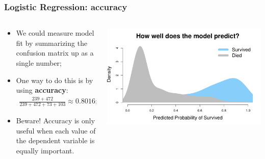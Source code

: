 \documentclass[aspectratio=169]{beamer}
\theoremstyle{principle}
\begin{document}
\begin{frame}
\frametitle{Logistic Regression: accuracy}

\begin{columns}
\begin{column}{0.5\textwidth}

\begin{itemize}
\item We could measure model fit by summarizing the confusion matrix up as a single number;
\bigskip
\bigskip

\item One way to do this is by using \textbf{accuracy}:
\begin{align*}
\frac{239 + 472}{239 + 472 + 73 + 103}\approx 0.8016;
\end{align*}
\bigskip

\item[]\color{white} Beware!  Accuracy is only useful when each value of the dependent variable is equally important.

\end{itemize}

\end{column}
\begin{column}{0.5\textwidth}

\includegraphics[scale=0.35]{titanic_prediction_dens.pdf}

\end{column}
\end{columns}

\end{frame}
\end{document}
